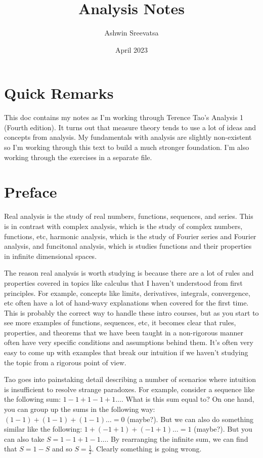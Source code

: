\documentclass[answers,12pt]{exam}
\title{Analysis Notes}
\author{Ashwin Sreevatsa}
\date{April 2023}
\begin{document}
\maketitle

\section*{Quick Remarks}
This doc contains my notes as I'm working through Terence Tao's Analysis 1 (Fourth edition).
It turns out that measure theory tends to use a lot of ideas and concepts from analysis.
My fundamentals with analysis are slightly non-existent so I'm working through this text to build a much stronger foundation.
I'm also working through the exercises in a separate file.


\section{Preface}
Real analysis is the study of real numbers, functions, sequences, and series.
This is in contrast with complex analysis, which is the study of complex numbers, functions, etc, harmonic analysis, which is the study of Fourier series and Fourier analysis, and funcitonal analysis, which is studies functions and their properties in infinite dimensional spaces.

The reason real analysis is worth studying is because there are a lot of rules and properties covered in topics like calculus that I haven't understood from first principles.
For example, concepts like limits, derivatives, integrals, convergence, etc often have a lot of hand-wavy explanations when covered for the first time.
This is probably the correct way to handle these intro courses, but as you start to see more examples of functions, sequences, etc, it becomes clear that rules, properties, and theorems that we have been taught in a non-rigorous manner often have very specific conditions and assumptions behind them.
It's often very easy to come up with examples that break our intuition if we haven't studying the topic from a rigorous point of view.

Tao goes into painstaking detail describing a number of scenarios where intuition is insufficient to resolve strange paradoxes.
For example, consider a sequence like the following sum: $1 - 1 + 1 - 1 + 1 \dots$.
What is this sum equal to?
On one hand, you can group up the sums in the following way:
$(1 - 1) + (1 - 1) + (1 - 1) \dots = 0$ (maybe?).
But we can also do something similar like the following:
$1 + (-1 + 1) + (-1 + 1) \dots = 1$ (maybe?).
But you can also take $S = 1 - 1 + 1 - 1 \dots$.
By rearranging the infinite sum, we can find that $S = 1 - S$ and so $S = \frac{1}{2}$.
Clearly something is going wrong.
\end{document}
